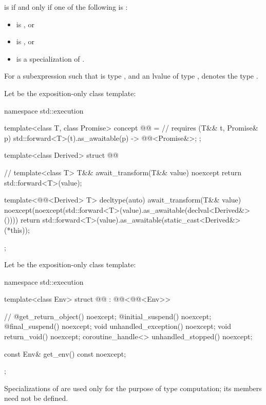  is 
if and only if one of the following is :
\begin{itemize}
\item {} is , or
\item {} is , or
\item {} is a specialization of .
\end{itemize}

\pnum
For a subexpression 
such that  is type , and
an lvalue  of type ,
 denotes
the type .

\pnum
Let  be the exposition-only class template:
\begin{codeblock}
namespace std::execution {
  template<class T, class Promise>
    concept @@ =                                  // \expos
      requires (T&& t, Promise& p) {
        { std::forward<T>(t).as_awaitable(p) } -> @@<Promise&>;
      };

  template<class Derived>
    struct @@ {                               // \expos
      template<class T>
        T&& await_transform(T&& value) noexcept {
          return std::forward<T>(value);
        }

      template<@@<Derived> T>
        decltype(auto) await_transform(T&& value)
          noexcept(noexcept(std::forward<T>(value).as_awaitable(declval<Derived&>()))) {
          return std::forward<T>(value).as_awaitable(static_cast<Derived&>(*this));
        }
    };
}
\end{codeblock}

\pnum
Let  be the exposition-only class template:
\begin{codeblock}
namespace std::execution {
  template<class Env>
  struct @@ : @@<@@<Env>> { // \expos
    @\unspec@ get_return_object() noexcept;
    @\unspec@ initial_suspend() noexcept;
    @\unspec@ final_suspend() noexcept;
    void unhandled_exception() noexcept;
    void return_void() noexcept;
    coroutine_handle<> unhandled_stopped() noexcept;

    const Env& get_env() const noexcept;
  };
}
\end{codeblock}
\begin{note}
Specializations of  are used only for the purpose of type computation;
its members need not be defined.
\end{note}

